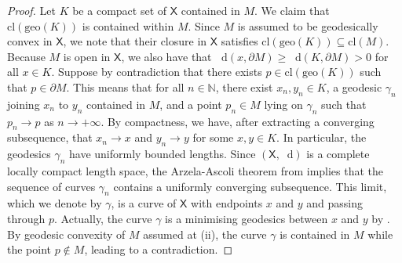 \documentclass[11pt,twoside,a4paper]{article}
\DeclareMathOperator{\supp}{supp}
\newcommand*\diff{\mathop{}\!\mathrm{d}}
\newcommand{\N}{\mathbb{N}}
\newcommand{\X}{\mathsf{X}}
\newcommand{\di}
{\mathsf d} %
\DeclareMathOperator{\Geo}{Geo}
\newcommand{\Prob}{\mathscr{P}}
\renewcommand{\phi}{\varphi}
\theoremstyle{theorem}
\theoremstyle{definition}
\theoremstyle{remark}
\theoremstyle{proof}
\begin{document}
\begin{proof}
    Let $K$ be a compact set of $\X$ contained in $M$. We claim that $\mathrm{cl}(\mathrm{geo}(K))$ is contained within $M$. Since $M$ is assumed to be geodesically convex in $\X$, we note that their closure in $\X$ satisfies $\mathrm{cl}(\mathrm{geo}(K)) \subseteq \mathrm{cl}(M)$. Because $M$ is open in $\X$, we also have that $\diff(x, \partial M) \geq \diff(K, \partial M) > 0$ for all $x \in K$. Suppose by contradiction that there exists $p \in \mathrm{cl}(\mathrm{geo}(K))$ such that $p \in \partial M$. This means that for all $n \in \N$, there exist $x_n, y_n \in K$, a geodesic $\gamma_n$ joining $x_n$ to $y_n$ contained in $M$, and a point $p_n \in M$ lying on $\gamma_n$ such that $p_n \to p$ as $n \to +\infty$. By compactness, we have, after extracting a converging subsequence, that $x_n \to x$ and $y_n \to y$ for some $x, y \in K$. In particular, the geodesics $\gamma_n$ have uniformly bounded lengths. Since $(\X, \diff)$ is a complete locally compact length space, the Arzela-Ascoli theorem from \cite[Theorem 2.5.14]{burago-burago-sergei2001} implies that the sequence of curves $\gamma_n$ contains a uniformly converging subsequence. This limit, which we denote by $\gamma$, is a curve of $\X$ with endpoints $x$ and $y$ and passing through $p$. Actually, the curve $\gamma$ is a minimising geodesics between $x$ and $y$ by \cite[Proposition 2.5.17]{burago-burago-sergei2001}. By geodesic convexity of $M$ assumed at (ii), the curve $\gamma$ is contained in $M$ while the point $p \notin M$, leading to a contradiction.



\end{proof}
\end{document}
